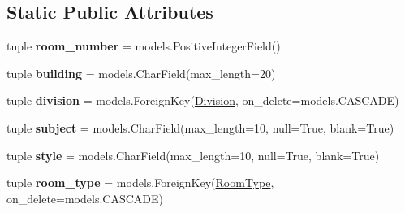 \subsection*{Static Public Attributes}
\begin{DoxyCompactItemize}
\item 
\hypertarget{classscheduler_1_1models_1_1_room_a660ac23615eb31108ba671bf7d9f9c42}{tuple {\bfseries room\-\_\-number} = models.\-Positive\-Integer\-Field()}\label{classscheduler_1_1models_1_1_room_a660ac23615eb31108ba671bf7d9f9c42}

\item 
\hypertarget{classscheduler_1_1models_1_1_room_ab0915771c9f821e436bddbd1ea6fca6c}{tuple {\bfseries building} = models.\-Char\-Field(max\-\_\-length=20)}\label{classscheduler_1_1models_1_1_room_ab0915771c9f821e436bddbd1ea6fca6c}

\item 
\hypertarget{classscheduler_1_1models_1_1_room_ae20a236603dca32bdaaad8e39c56f7ea}{tuple {\bfseries division} = models.\-Foreign\-Key(\hyperlink{classscheduler_1_1models_1_1_division}{Division}, on\-\_\-delete=models.\-C\-A\-S\-C\-A\-D\-E)}\label{classscheduler_1_1models_1_1_room_ae20a236603dca32bdaaad8e39c56f7ea}

\item 
\hypertarget{classscheduler_1_1models_1_1_room_a2d22ce39edfab7df4a4ddb50a7f15b7f}{tuple {\bfseries subject} = models.\-Char\-Field(max\-\_\-length=10, null=True, blank=True)}\label{classscheduler_1_1models_1_1_room_a2d22ce39edfab7df4a4ddb50a7f15b7f}

\item 
\hypertarget{classscheduler_1_1models_1_1_room_a8c295adc95a6f79e9a205576a76aba10}{tuple {\bfseries style} = models.\-Char\-Field(max\-\_\-length=10, null=True, blank=True)}\label{classscheduler_1_1models_1_1_room_a8c295adc95a6f79e9a205576a76aba10}

\item 
\hypertarget{classscheduler_1_1models_1_1_room_ac160d40e28f0ce48c1b2843b225981ab}{tuple {\bfseries room\-\_\-type} = models.\-Foreign\-Key(\hyperlink{classscheduler_1_1models_1_1_room_type}{Room\-Type}, on\-\_\-delete=models.\-C\-A\-S\-C\-A\-D\-E)}\label{classscheduler_1_1models_1_1_room_ac160d40e28f0ce48c1b2843b225981ab}

\end{DoxyCompactItemize}


